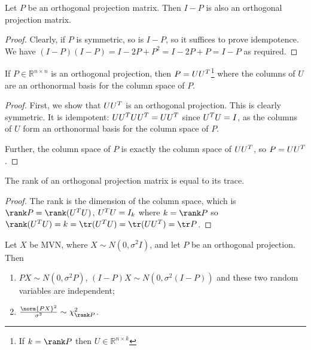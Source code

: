 \begin{corollary}
	Let $P$ be an orthogonal projection matrix.
	Then $I-P$ is also an orthogonal projection matrix.
\end{corollary}

\begin{proof}
	Clearly, if $P$ is symmetric, so is $I-P$, so it suffices to prove idempotence.
	We have $(I-P)(I-P) = I - 2P + P^2 = I - 2P + P = I - P$ as required.
\end{proof}

\begin{proposition}
	If $P \in \mathbb{R}^{n \times n}$ is an orthogonal projection, then $P = UU^T$\footnote{If $k = \rank P$ then $U \in \mathbb{R}^{n \times k}$} where the columns of $U$ are an orthonormal basis for the column space of $P$.
\end{proposition}

\begin{proof}
	First, we show that $UU^T$ is an orthogonal projection.
	This is clearly symmetric.
	It is idempotent: $U U^T U U^T = U U^T$ since $U^T U = I$, as the columns of $U$ form an orthonormal basis for the column space of $P$.

	Further, the column space of $P$ is exactly the column space of $U U^T$, so $P = U U^T$.
\end{proof}

\begin{proposition}
	The rank of an orthogonal projection matrix is equal to its trace.
\end{proposition}

\begin{proof}
	The rank is the dimension of the column space, which is $\rank P = \rank(U^\tran U)$, $U^T U = I_k$ where $k = \rank P$ so $\rank (U^\tran U) = k = \tr(U^\tran U) = \tr(U U^\tran) = \tr P$.
\end{proof}

\begin{theorem} \label{thm:6.1}
	Let $X$ be MVN, where $X \sim N(0,\sigma^2 I)$, and let $P$ be an orthogonal projection.
	Then
	\begin{enumerate}
		\item $PX \sim N(0,\sigma^2 P)$, $(I-P)X \sim N(0,\sigma^2(I-P))$ and these two random variables are independent;
		\item $\frac{\norm{PX}^2}{\sigma^2} \sim \chi^2_{\rank P}$.
	\end{enumerate}
\end{theorem}

